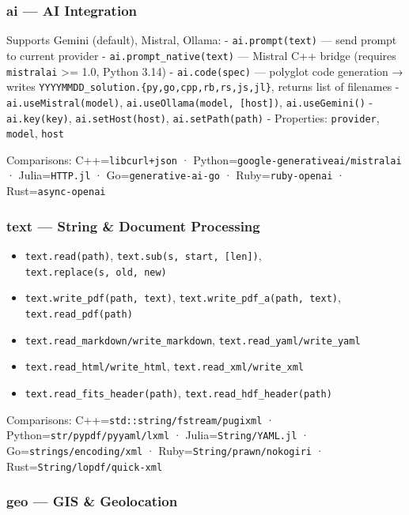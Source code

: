 \documentclass[
]{article}
\providecommand{\tightlist}{%
  \setlength{\itemsep}{0pt}\setlength{\parskip}{0pt}}
\begin{document}
\subsubsection{ai --- AI Integration}\label{ai-ai-integration}

Supports Gemini (default), Mistral, Ollama: - \texttt{ai.prompt(text)}
--- send prompt to current provider - \texttt{ai.prompt\_native(text)}
--- Mistral C++ bridge (requires \texttt{mistralai} \textgreater= 1.0,
Python 3.14) - \texttt{ai.code(spec)} --- polyglot code generation →
writes \texttt{YYYYMMDD\_solution.\{py,go,cpp,rb,rs,js,jl\}}, returns
list of filenames - \texttt{ai.useMistral(model)},
\texttt{ai.useOllama(model,\ {[}host{]})}, \texttt{ai.useGemini()} -
\texttt{ai.key(key)}, \texttt{ai.setHost(host)},
\texttt{ai.setPath(path)} - Properties: \texttt{provider},
\texttt{model}, \texttt{host}

Comparisons: C++=\texttt{libcurl+json} ·
Python=\texttt{google-generativeai/mistralai} · Julia=\texttt{HTTP.jl} ·
Go=\texttt{generative-ai-go} · Ruby=\texttt{ruby-openai} ·
Rust=\texttt{async-openai}

\subsubsection{text --- String \& Document
Processing}\label{text-string-document-processing}

\begin{itemize}
\tightlist
\item
  \texttt{text.read(path)}, \texttt{text.sub(s,\ start,\ {[}len{]})},
  \texttt{text.replace(s,\ old,\ new)}
\item
  \texttt{text.write\_pdf(path,\ text)},
  \texttt{text.write\_pdf\_a(path,\ text)},
  \texttt{text.read\_pdf(path)}
\item
  \texttt{text.read\_markdown/write\_markdown},
  \texttt{text.read\_yaml/write\_yaml}
\item
  \texttt{text.read\_html/write\_html},
  \texttt{text.read\_xml/write\_xml}
\item
  \texttt{text.read\_fits\_header(path)},
  \texttt{text.read\_hdf\_header(path)}
\end{itemize}

Comparisons: C++=\texttt{std::string/fstream/pugixml} ·
Python=\texttt{str/pypdf/pyyaml/lxml} · Julia=\texttt{String/YAML.jl} ·
Go=\texttt{strings/encoding/xml} · Ruby=\texttt{String/prawn/nokogiri} ·
Rust=\texttt{String/lopdf/quick-xml}

\subsubsection{geo --- GIS \& Geolocation}\label{geo-gis-geolocation}
\end{document}
